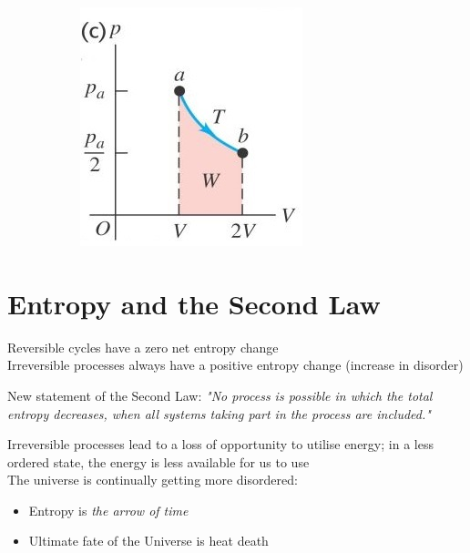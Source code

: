 \documentclass[a4paper, 11pt, normalem]{report}
\begin{document}
\begin{figure}[H]
\begin{subfigure}{0.3\textwidth}
		\includegraphics[width=\textwidth]{Entropy2.jpg}
	\end{subfigure}
\end{figure}

\section{Entropy and the Second Law}
Reversible cycles have a zero net entropy change \\
Irreversible processes always have a positive entropy change (increase in disorder)

New statement of the Second Law: \emph{"No process is possible in which the total entropy decreases, when all systems taking part in the process are included."}

Irreversible processes lead to a loss of opportunity to utilise energy; in a less ordered state, the energy is less available for us to use \\
The universe is continually getting more disordered:
\begin{itemize}
	\item Entropy is \emph{the arrow of time}
	\item Ultimate fate of the Universe is heat death
\end{itemize}
\end{document}
